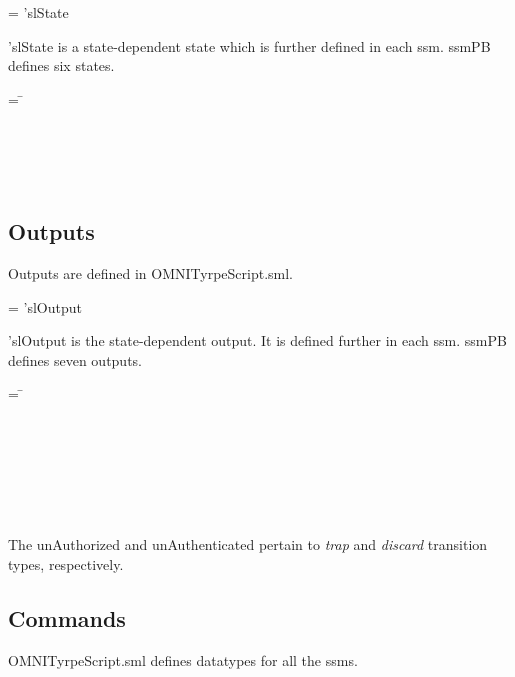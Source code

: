 \documentclass[../../main/main.tex]{subfiles}
\begin{document}
 =   \HOLTokenBar{}  'slState

'slState is a state-dependent state which is further defined in each \gls{ssm}.  ssmPB defines six states.

\begin{tabbing}
 = \= \\
					\>\HOLTokenBar{}  \\
					\>\HOLTokenBar{}  \\
					\>\HOLTokenBar{} \\
        					\>\HOLTokenBar{}  \\
					\>\HOLTokenBar{} 
\end{tabbing}

\subsection{Outputs}
Outputs are defined in OMNITyrpeScript.sml.

 =   \HOLTokenBar{}  'slOutput

 'slOutput is the state-dependent output.  It is defined further in each \gls{ssm}.  ssmPB defines seven outputs.

\begin{tabbing}
 = \= \\
					\>\HOLTokenBar{}  \\
					\>\HOLTokenBar{}  \\
					\>\HOLTokenBar{} \\
         				\>\HOLTokenBar{}  \\
					\>\HOLTokenBar{}  \\
					\>\HOLTokenBar{} \\
         				\>\HOLTokenBar{} 
\end{tabbing}

The unAuthorized and unAuthenticated pertain to \textit{trap} and \textit{discard} transition types, respectively.

\subsection{Commands}
OMNITyrpeScript.sml defines datatypes for all the \glspl{ssm}.
\end{document}

